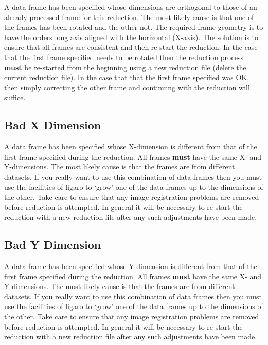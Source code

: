 \documentclass[twoside,11pt]{article}
\newcommand{\xref}[3]{#1}
\newcommand{\xlabel}[1]{}
\renewcommand{\_}{\texttt{\symbol{95}}}
\newcommand{\mlabel}[1]{\xlabel{#1}\label{#1}}
\newcommand{\myindex}[1]{\index{#1}}
\newcommand{\myindex}[1]{}
\begin{document}
A data frame has been specified whose dimensions are orthogonal to those
of an already processed frame for this reduction. The most likely cause
is that one of the frames has been rotated and the other not. The
required frame geometry is to have the orders long axis aligned with the
horizontal (X-axis). The solution is to ensure that all
frames are consistent  and then re-start the reduction. In the case that
the first frame specified needs to be rotated then the reduction process
{\bf must} be re-started from the beginning using a new reduction file (delete
the current reduction file). In the case that that the first frame
specified was OK, then simply correcting the other frame and continuing
with the reduction will suffice.

\subsection{\mlabel{bad_x_dimension} Bad X Dimension}
\myindex{Frame dimensions}

A data frame has been specified whose X-dimension is different from that
of the first frame specified during the reduction. All frames {\bf must} have
the same X- and Y-dimensions. The most likely cause is that the frames
are from different datasets. If you really want to use this combination
of data frames then you must use the facilities of \xref{{\sc figaro}}{sun86}{}
to `grow' one
of the data frames up to the dimensions of the other.
Take care to ensure that any image registration problems are removed
before reduction is attempted.
In general it will be necessary to re-start the reduction with a new
reduction file after any such adjustments have been made.

\subsection{\mlabel{bad_y_dimension} Bad Y Dimension}

A data frame has been specified whose Y-dimension is different from that
of the first frame specified during the reduction. All frames {\bf must} have
the same X- and Y-dimensions. The most likely cause is that the frames
are from different datasets. If you really want to use this combination
of data frames then you must use the facilities of \xref{{\sc figaro}}{sun86}{}
to `grow' one
of the data frames up to the dimensions of the other.
Take care to ensure that any image registration problems are removed
before reduction is attempted.
In general it will be necessary to re-start the reduction with a new
reduction file after any such adjustments have been made.
\end{document}
